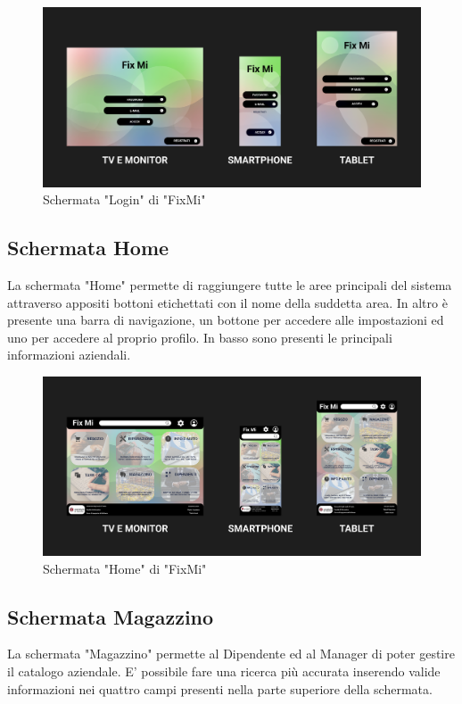 \documentclass{report}
\begin{document}
\begin{figure}[H]
	\centering
	\includegraphics[width=1\textwidth]{images/Snapshots/login_snapshot.png}
	\caption{Schermata "Login" di "FixMi"}
\end{figure}	

\subsection*{Schermata Home}

La schermata "Home" permette di raggiungere tutte le aree principali del sistema attraverso appositi bottoni etichettati con il nome della suddetta area. In altro è presente una barra di navigazione, un bottone per accedere alle impostazioni ed uno per accedere al proprio profilo. In basso sono presenti le principali informazioni aziendali.

\begin{figure}[H]
	\centering
	\includegraphics[width=1\textwidth]{images/Snapshots/mainpage_snapshot.png}
	\caption{Schermata "Home" di "FixMi"}
\end{figure}	

\subsection*{Schermata Magazzino}
La schermata "Magazzino" permette al Dipendente ed al Manager di poter gestire il catalogo aziendale. E' possibile fare una ricerca più accurata inserendo valide informazioni nei quattro campi presenti nella parte superiore della schermata.
\end{document}
